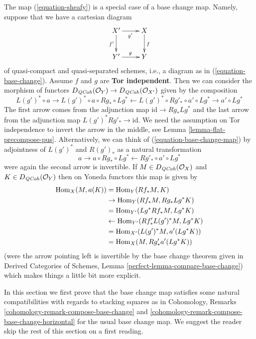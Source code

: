 \noindent
The map (\ref{equation-sheafy}) is a special case of a base change map.
Namely, suppose that we have a cartesian diagram
$$
\xymatrix{
X' \ar[r]_{g'} \ar[d]_{f'} & X \ar[d]^f \\
Y' \ar[r]^g & Y
}
$$
of quasi-compact and quasi-separated schemes, i.e., a diagram as in
(\ref{equation-base-change}). Assume $f$ and $g$ are {\bf Tor independent}.
Then we can consider the morphism of functors
$D_{\mathit{QCoh}}(\mathcal{O}_Y) \to D_{\mathit{QCoh}}(\mathcal{O}_{X'})$
given by the composition
\begin{equation}
\label{equation-base-change-map}
L(g')^* \circ a \to
L(g')^* \circ a \circ Rg_* \circ Lg^* \leftarrow
L(g')^* \circ Rg'_* \circ a' \circ Lg^* \to a' \circ Lg^*
\end{equation}
The first arrow comes from the adjunction map $\text{id} \to Rg_* Lg^*$
and the last arrow from the adjunction map $L(g')^*Rg'_* \to \text{id}$.
We need the assumption on Tor independence to invert the arrow
in the middle, see Lemma \ref{lemma-flat-precompose-pus}.
Alternatively, we can think of (\ref{equation-base-change-map}) by
adjointness of $L(g')^*$ and $R(g')_*$ as a natural transformation
$$
a \to a \circ Rg_* \circ Lg^* \leftarrow Rg'_* \circ a' \circ Lg^*
$$
were again the second arrow is invertible. If $M \in D_{\mathit{QCoh}}(\mathcal{O}_X)$
and $K \in D_{\mathit{QCoh}}(\mathcal{O}_Y)$
then on Yoneda functors this map is given by
\begin{align*}
\mathop{\mathrm{Hom}}\nolimits_X(M, a(K))
& =
\mathop{\mathrm{Hom}}\nolimits_Y(Rf_*M, K) \\
& \to
\mathop{\mathrm{Hom}}\nolimits_Y(Rf_*M, Rg_* Lg^*K) \\
& =
\mathop{\mathrm{Hom}}\nolimits_{Y'}(Lg^*Rf_*M, Lg^*K) \\
& \leftarrow
\mathop{\mathrm{Hom}}\nolimits_{Y'}(Rf'_* L(g')^*M, Lg^*K) \\
& =
\mathop{\mathrm{Hom}}\nolimits_{X'}(L(g')^*M, a'(Lg^*K)) \\
& =
\mathop{\mathrm{Hom}}\nolimits_X(M, Rg'_*a'(Lg^*K))
\end{align*}
(were the arrow pointing left is invertible by the base
change theorem given in
Derived Categories of Schemes, Lemma \ref{perfect-lemma-compare-base-change})
which makes things a little bit more explicit.

\medskip\noindent
In this section we first prove that the base change map satisfies
some natural compatibilities with regards to stacking squares as in
Cohomology, Remarks \ref{cohomology-remark-compose-base-change} and
\ref{cohomology-remark-compose-base-change-horizontal} for the usual
base change map. We suggest the reader skip the rest of this section
on a first reading.

